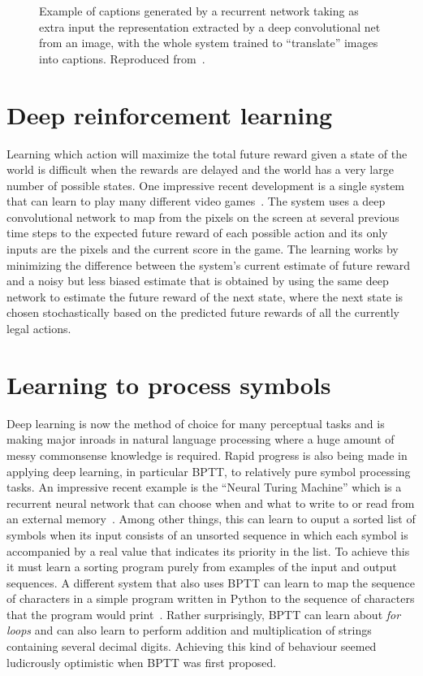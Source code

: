 \documentclass[]{article}
\begin{document}
\begin{figure}[ht]
\caption{Example of captions generated by a recurrent network taking
as extra input the representation extracted by a deep convolutional
net from an image, with the whole system trained to ``translate''
images into captions. Reproduced from~\citet{?}.
}
\label{fig:caption-generation}
\end{figure}


\section{Deep reinforcement learning}

Learning which action will maximize the total future reward given a state
of the world is difficult when the rewards are delayed and the world has a
very large number of possible states. One impressive recent development is
a single system that can learn to play many different video
games~\cite{NatureAtari}. The system uses a deep convolutional network to
map from the pixels on the screen at several previous time steps to the
expected future reward of each possible action and its only inputs are the
pixels and the current score in the game. The learning works by minimizing
the difference between the system's current estimate of future reward and a
noisy but less biased estimate that is obtained by using the same deep
network to estimate the future reward of the next state, where the next
state is chosen stochastically based on the predicted future rewards of all
the currently legal actions.

\section{Learning to process symbols}

Deep learning is now the method of choice for many perceptual tasks and is
making major inroads in natural language processing where a huge amount of
messy commonsense knowledge is required. Rapid progress is also being made
in applying deep learning, in particular BPTT, to relatively pure symbol processing tasks.
An impressive recent example is the ``Neural Turing Machine'' which is a
recurrent neural network that can choose when and what to write to or read
from an external memory~\cite{NTM}. Among other things, this can learn to
ouput a sorted list of symbols when its input consists of an unsorted
sequence in which each symbol is accompanied by a real value that indicates
its priority in the list.  To achieve this it must learn a sorting program
purely from examples of the input and output sequences.  A different system
that also uses BPTT can learn to map the sequence of characters in a simple
program written in Python to the sequence of characters that the program
would print~\cite{Woj}. Rather surprisingly, BPTT can learn about {\it for
  loops} and can also learn to perform addition and multiplication of
strings containing several decimal digits. Achieving this kind of behaviour
seemed ludicrously optimistic when BPTT was first proposed.
  
\end{document}

